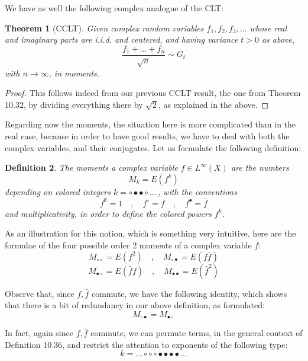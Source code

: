 \documentclass[12pt]{amsbook}
\newtheorem{theorem}{Theorem}[chapter]
\newtheorem{definition}[theorem]{Definition}
\begin{document}
We have as well the following complex analogue of the CLT:


\begin{theorem}[CCLT]
Given complex random variables $f_1,f_2,f_3,\ldots$ whose real and imaginary parts are i.i.d. and centered, and having variance $t>0$ as above,
$$\frac{f_1+\ldots+f_n}{\sqrt{n}}\sim G_t$$
with $n\to\infty$, in moments.
\end{theorem}

\begin{proof}
This follows indeed from our previous CCLT result, the one from Theorem 10.32, by dividing everything there by $\sqrt{2}$, as explained in the above.
\end{proof}

Regarding now the moments, the situation here is more complicated than in the real case, because in order to have good results, we have to deal with both the complex variables, and their conjugates. Let us formulate the following definition:


\begin{definition}
The moments a complex variable $f\in L^\infty(X)$ are the numbers
$$M_k=E(f^k)$$
depending on colored integers $k=\circ\bullet\bullet\circ\ldots\,$, with the conventions
$$f^\emptyset=1\quad,\quad f^\circ=f\quad,\quad f^\bullet=\bar{f}$$
and multiplicativity, in order to define the colored powers $f^k$.
\end{definition}

As an illustration for this notion, which is something very intuitive, here are the formulae of the four possible order 2 moments of a complex variable $f$:
$$M_{\circ\circ}=E(f^2)\quad,\quad M_{\circ\bullet}=E(f\bar{f})$$
$$M_{\bullet\circ}=E(\bar{f}f)\quad,\quad M_{\bullet\bullet}=E(\bar{f}^2)$$

Observe that, since $f,\bar{f}$ commute, we have the following identity, which shows that there is a bit of redundancy in our above definition, as formulated:
$$M_{\circ\bullet}=M_{\bullet\circ}$$

In fact, again since $f,\bar{f}$ commute, we can permute terms, in the general context of Definition 10.36, and restrict the attention to exponents of the following type:
$$k=\ldots\circ\circ\circ\bullet\bullet\bullet\bullet\ldots$$
\end{document}
